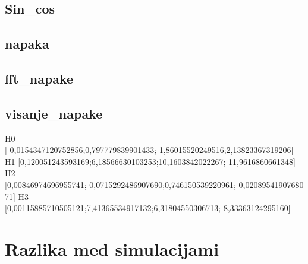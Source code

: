 \subsection{Sin\_cos}
\subsection{napaka}
\subsection{fft\_napake}
\subsection{visanje\_napake}

H0	[-0,0154347120752856;0,797779839901433;-1,86015520249516;2,13823367319206]
H1	[0,120051243593169;6,18566630103253;10,1603842022267;-11,9616860661348]
H2	[0,00846974696955741;-0,0715292486907690;0,746150539220961;-0,0208954190768071]
H3	[0,00115885710505121;7,41365534917132;6,31804550306713;-8,33363124295160]


\section{Razlika med simulacijami}